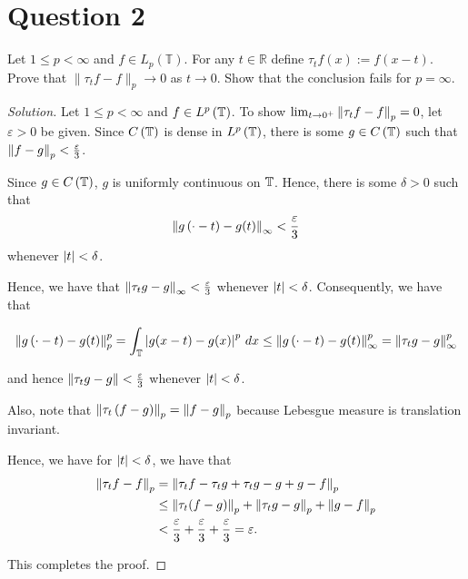 \section{Question 2}
\horz
Let $1\leq p<\infty$ and $f\in L_p(\mathbb T)$. For any $t\in\mathbb R$ define $\tau_tf(x):=f(x-t).$ Prove that $\|\tau_tf-f\|_p\to 0$ as $t\to 0$. Show that the conclusion fails for $p=\infty.$ 
\horz
\begin{proof}[Solution]
Let $1\le p < \infty$ and $f\in L^{p} \left( \mathbb T \right)$. To show $\lim_{t\to 0^{+}} \left\lVert \tau_{t} f - f \right\rVert_{p} = 0$, let $\varepsilon > 0$ be given. Since $C\left( \mathbb T \right)$ is dense in $L^{p} \left( \mathbb T \right)$, there is some $g \in C\left( \mathbb T \right)$ such that $\left\lVert f-g \right\rVert_{p} < \frac{\varepsilon}{3}$.

Since $g \in C\left( \mathbb T \right)$, $g$ is uniformly continuous on $\mathbb T$. Hence, there is some $\delta >0$ such that 
\begin{equation*}
\left\lVert g\left( \cdot -t \right) - g(t) \right\rVert_{\infty} < \frac{\varepsilon}{3}
\end{equation*}
whenever $\left\lvert t \right\rvert < \delta$.

Hence, we have that $\left\lVert \tau_{t}g - g \right\rVert_{\infty} < \frac{\varepsilon}{3}$ whenever $\left\lvert t \right\rvert < \delta$. Consequently, we have that

\begin{equation*}
\left\lVert g\left( \cdot - t \right) - g(t) \right\rVert_{p}^{p} = \int_{\mathbb T} \left\lvert g(x-t)-g(x) \right\rvert^p \, dx \le \left\lVert g\left( \cdot -t \right) - g(t) \right\rVert_{\infty}^{p} =\left\lVert \tau_{t}g - g \right\rVert_{\infty}^{p}
\end{equation*}

and hence $\left\lVert \tau_{t} g -g \right\rVert < \frac{\varepsilon}{3}$ whenever $\left\lvert t \right\rvert< \delta$.


Also, note that $\left\lVert \tau_{t} \left( f-g \right) \right\rVert_{p} = \left\lVert f-g \right\rVert_{p}$ because Lebesgue measure is translation invariant.

Hence, we have for $\left\lvert t \right\rvert < \delta$, we have that
\begin{align*}
\left\lVert \tau_{t} f - f \right\rVert_{p} &= \left\lVert \tau_{t} f - \tau_{t}g + \tau_{t}g - g + g -f \right\rVert_{p} \\
&\le \left\lVert \tau_{t} (f-g) \right\rVert_{p} + \left\lVert \tau_{t} g - g \right\rVert_{p} + \left\lVert g-f \right\rVert_{p} \\
&< \frac{\varepsilon}{3} + \frac{\varepsilon}{3} + \frac{\varepsilon}{3} = \varepsilon.
\end{align*}

This completes the proof.
\end{proof}
